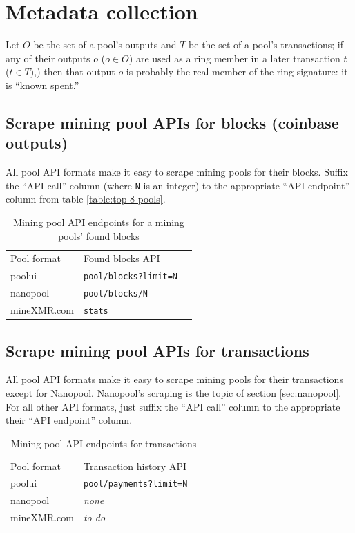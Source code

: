 \documentclass[notitlepage]{report}
\begin{document}

\section{Metadata collection}
\setcounter{chapter}{3}

Let $O$ be the set of a pool's outputs and $T$ be the set of a pool's transactions; if any of their outputs $o$ ($o \in O$) are used as a ring member in a later transaction $t$ ($t \in T$),) then that output $o$ is probably the real member of the ring signature: it is ``known spent.''

\subsection{Scrape mining pool APIs for blocks (coinbase outputs)}

All pool API formats make it easy to scrape mining pools for their blocks.  Suffix the ``API call'' column (where \verb/N/ is an integer) to the appropriate ``API endpoint'' column from table \ref{table:top-8-pools}.

\begin{table}[h]
\centering
\caption{Mining pool API endpoints for a mining pools' found blocks}
\begin{tabular}{lll}
Pool format     & Found blocks API           \\
poolui          & \verb|pool/blocks?limit=N| \\
nanopool        & \verb|pool/blocks/N|       \\
mineXMR.com     & \verb|stats|
\end{tabular}
\label{table:blocks-api}
\end{table}


\subsection{Scrape mining pool APIs for transactions}

All pool API formats make it easy to scrape mining pools for their transactions except for Nanopool.  Nanopool's scraping is the topic of section \ref{sec:nanopool}.  For all other API formats, just suffix the ``API call'' column to the appropriate their ``API endpoint'' column.

\begin{table}[h]
\centering
\caption{Mining pool API endpoints for transactions}
\begin{tabular}{lll}
Pool format     & Transaction history API      \\
poolui          & \verb|pool/payments?limit=N| \\
nanopool        & \textit{none}                \\ %
mineXMR.com     & \textit{to do}
\end{tabular}
\label{table:transactions-api}
\end{table}
\end{document}

